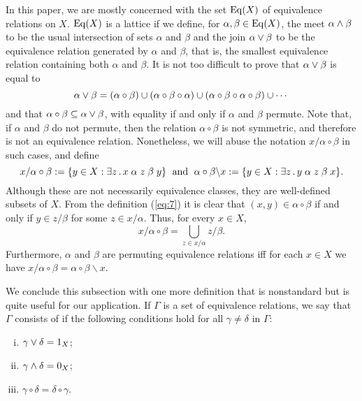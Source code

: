 In this paper, we are mostly concerned with the set 
$\operatorname{Eq}(X)$ of equivalence relations on $X$. 
$\operatorname{Eq}(X)$ is a lattice if we define, 
for $\alpha, \beta \in \operatorname{Eq}(X)$, the meet $\alpha\wedge \beta$
to be the usual intersection of sets $\alpha$ and $\beta$ and the join 
$\alpha \vee \beta$ to be the equivalence relation generated by
$\alpha$ and $\beta$, that is, the smallest equivalence relation containing both 
$\alpha$ and $\beta$.  It is not too difficult to prove that 
$\alpha \vee \beta$ is equal to 
\[
\alpha \vee \beta = (\alpha\circ \beta) \cup 
(\alpha\circ \beta \circ \alpha) \cup
(\alpha\circ \beta \circ \alpha \circ \beta) \cup \cdots
\]
and that 
$\alpha \circ \beta \subseteq \alpha \vee \beta$,
with equality if and only if $\alpha$ and $\beta$ permute.
Note that, if $\alpha$ and $\beta$ do not permute, then 
the relation $\alpha\circ \beta$ is not symmetric, and therefore 
is not an equivalence relation.
Nonetheless, we will abuse the notation
$x/\alpha\circ \beta$ in such cases, and define
\begin{equation*}
x/\alpha\circ \beta:= \{y\in X : \exists z\,.\, x \mathrel{\alpha} z \mathrel{\beta} y\}
\;\text{ and }\;
\alpha\circ \beta\backslash x:= \{y\in X : \exists z\,.\, y \mathrel{\alpha} z \mathrel{\beta} x\}.
\end{equation*}
Although these are not necessarily
equivalence classes, they are well-defined subsets of $X$. 
From the definition (\ref{eq:7}) it is clear that %
$(x,y) \in \alpha\circ \beta$ if and only if
$y \in z/\beta$ for some $z\in x/\alpha$.  Thus, for every $x\in X$,
  \begin{equation}
    \label{eq:1}
x/\alpha\circ \beta = \bigcup_{z \in x/\alpha} z/\beta.
  \end{equation}
 Furthermore,
$\alpha$ and $\beta$ are permuting equivalence relations 
iff for each $x\in X$ we have $x/\alpha\circ \beta = \alpha\circ \beta\backslash x$.

We conclude this subsection with one more definition
that is nonstandard but is quite useful for our application.
If $\Gamma$ is a set of equivalence relations, 
we say that $\Gamma$ consists of 
if the following conditions hold for all $\gamma \neq \delta$ in $\Gamma$:
\begin{enumerate}[(i)]
\item $\gamma \vee \delta = 1_X$;
\item $\gamma \wedge \delta = 0_X$;  
\item $\gamma \circ \delta = \delta \circ \gamma$.  
\end{enumerate}




